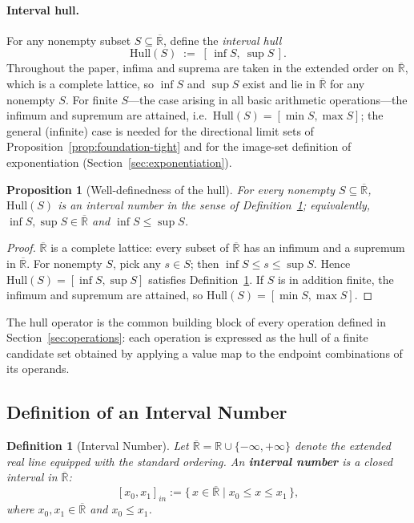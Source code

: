 \documentclass[11pt,a4paper]{article}
\theoremstyle{paperdef}
\newtheorem{proposition}[theorem]{Proposition}
\newtheorem{definition}[theorem]{Definition}
\newcommand{\Rext}{\overline{\mathbb{R}}}
\newcommand{\inI}[1]{[#1]_{in}}
\begin{document}
\paragraph{Interval hull.}
For any nonempty subset $S \subseteq \Rext$, define the
\emph{interval hull}
\[
\mathrm{Hull}(S) \;:=\; [\,\inf S,\ \sup S\,].
\]
Throughout the paper, infima and suprema are taken in the extended
order on $\Rext$, which is a complete lattice, so $\inf S$ and
$\sup S$ exist and lie in $\Rext$ for any nonempty $S$. For finite
$S$---the case arising in all basic arithmetic operations---the
infimum and supremum are attained, i.e.\
$\mathrm{Hull}(S) = [\min S, \max S]$; the general (infinite) case is
needed for the directional limit sets of
Proposition~\ref{prop:foundation-tight} and for the image-set
definition of exponentiation (Section~\ref{sec:exponentiation}).

\begin{proposition}[Well-definedness of the hull]\label{prop:hull}
For every nonempty $S \subseteq \Rext$, $\mathrm{Hull}(S)$ is
an interval number in the sense of
Definition~\ref{def:interval-number}; equivalently,
$\inf S, \sup S \in \Rext$ and $\inf S \le \sup S$.
\end{proposition}

\begin{proof}
$\Rext$ is a complete lattice: every subset of $\Rext$ has an infimum
and a supremum in $\Rext$. For nonempty $S$, pick any $s \in S$; then
$\inf S \le s \le \sup S$. Hence
$\mathrm{Hull}(S) = [\inf S, \sup S]$ satisfies
Definition~\ref{def:interval-number}. If $S$ is in addition finite,
the infimum and supremum are attained, so
$\mathrm{Hull}(S) = [\min S, \max S]$.
\end{proof}

The hull operator is the common building block of every operation
defined in Section~\ref{sec:operations}: each operation is expressed
as the hull of a finite candidate set obtained by applying a
value map to the endpoint combinations of its operands.

\subsection{Definition of an Interval Number}

\begin{definition}[Interval Number]\label{def:interval-number}
Let $\Rext = \mathbb{R} \cup \{-\infty, +\infty\}$ denote the extended
real line equipped with the standard ordering. An \textbf{interval
number} is a closed interval in $\Rext$:
\[
\inI{x_0, x_1} := \{\, x \in \Rext \mid x_0 \le x \le x_1 \,\},
\]
where $x_0, x_1 \in \Rext$ and $x_0 \le x_1$.
\end{definition}
\end{document}
